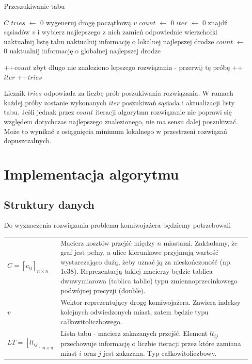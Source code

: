 \documentclass[11pt,a4paper,twoside]{article}
\begin{document}
\begin{algorithm}[ht]
\caption{Przeszukiwanie tabu}
\label{tabuSearchAlg}
\begin{algorithmic}%
\Require $C$
	\State $tries$ $\leftarrow$ 0
		\State wygeneruj drogę początkową $v$
		\State $count$ $\leftarrow$ 0
		\State $iter$ $\leftarrow$ 0
			\State znajdź sąsiadów $v$ i wybierz najlepszego z nich
			\State zamień odpowiednie wierzchołki
			\State uaktualnij listę tabu
				\State uaktualnij informację o lokalnej najlepszej drodze
				\State $count$ $\leftarrow$ 0
					\State uaktualnij informację o globalnej najlepszej drodze
					
    			\EndIf
    		
    		\Else
    			\State ++$count$
    		\EndIf
    			\State zbyt długo nie znaleziono lepszego rozwiązania - przerwij tę próbę
    		\EndIf
    	\State ++$iter$
		\EndWhile
		\State ++$tries$
	\EndWhile
\end{algorithmic}
\end{algorithm}

Licznik $tries$ odpowiada za liczbę prób poszukiwania rozwiązania. W ramach każdej próby zostanie wykonanych $iter$ poszukiwań sąsiada i aktualizacji listy tabu. Jeśli jednak przez $count$ iteracji algorytmu rozwiązanie nie poprawi się względem dotychczas najlepszego znalezionego, nie ma sensu dalej poszukiwać. Może to wynikać z osiągnięcia minimum lokalnego w przestrzeni rozwiązań dopuszczalnych.

\section{Implementacja algorytmu}

\subsection{Struktury danych}
Do wyznaczenia rozwiązania problemu komiwojażera będziemy potrzebowali
\bgroup
\def\arraystretch{1.5}
\begin{tabularx}{\textwidth}{l|X}
$C = [c_{ij}]_{n\times n}$ & Macierz kosztów przejść między $n$ miastami. Zakładamy, że graf jest pełny, a ulice kierunkowe przyjmują wartość wystarczająco dużą, żeby uznać ją za nieskończoność (np. 1e38). Reprezentacją takiej macierzy będzie tablica dwuwymiarowa (tablica tablic) typu zmiennoprzecinkowego podwójnej precyzji (double).\\
$v$ & Wektor reprezentujący drogę komiwojażera. Zawiera indeksy kolejnych odwiedzonych miast, zatem będzie typu całkowitoliczbowego. \\
$LT = [lt_{ij}]_{n\times n}$ & Lista tabu - macierz zakazanych przejść. Element $lt_{ij}$ przechowuje informację o liczbie iteracji przez które zamiana miast $i$ oraz $j$ jest zakazana. Typ całkowitoliczbowy.\\
\end{tabularx}
\egroup
\end{document}
